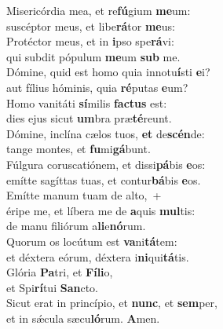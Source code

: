 \evenverse Misericórdia mea, et re\textbf{fú}gium \textbf{me}um:~\*\\
\evenverse suscéptor meus, et libe\textbf{rá}tor \textbf{me}us:\\
\oddverse Protéctor meus, et in \textbf{i}pso spe\textbf{rá}vi:~\*\\
\oddverse qui subdit pópulum \textbf{me}um \textbf{sub} me.\\
\evenverse Dómine, quid est homo quia innotu\textbf{í}sti \textbf{e}i?~\*\\
\evenverse aut fílius hóminis, quia \textbf{ré}putas \textbf{e}um?\\
\oddverse Homo vanitáti \textbf{sí}milis \textbf{fa}\textbf{ctus} est:~\*\\
\oddverse dies ejus sicut \textbf{um}bra præ\textbf{té}reunt.\\
\evenverse Dómine, inclína cælos tuos, \textbf{et} de\textbf{scén}de:~\*\\
\evenverse tange montes, et \textbf{fu}mi\textbf{gá}bunt.\\
\oddverse Fúlgura coruscatiónem, et dissi\textbf{pá}bis \textbf{e}os:~\*\\
\oddverse emítte sagíttas tuas, et contur\textbf{bá}bis \textbf{e}os.\\
\evenverse Emítte manum tuam de alto,~+\\
\evenverse  éripe me, et líbera me de \textbf{a}quis \textbf{mul}tis:~\*\\
\evenverse de manu filiórum a\textbf{li}e\textbf{nó}rum.\\
\oddverse Quorum os locútum est \textbf{va}ni\textbf{tá}tem:~\*\\
\oddverse et déxtera eórum, déxtera i\textbf{ni}qui\textbf{tá}tis.\\
\evenverse Glória \textbf{Pa}tri, et \textbf{Fí}\textbf{li}o,~\*\\
\evenverse et Spi\textbf{rí}tui \textbf{San}cto.\\
\oddverse Sicut erat in princípio, et \textbf{nunc}, et \textbf{sem}per,~\*\\
\oddverse et in sǽcula sæcu\textbf{ló}rum. \textbf{A}men.\\
